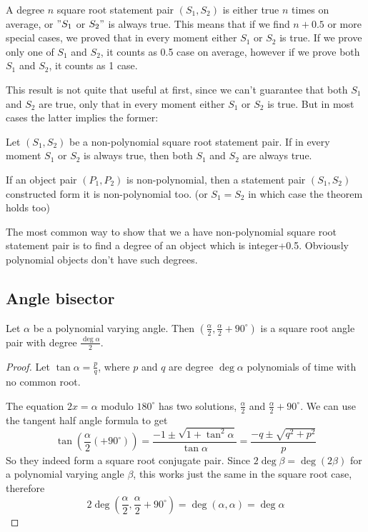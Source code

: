 \documentclass[a4paper]{article}
\begin{document}
A degree $n$ square root statement pair $(S_1,S_2)$ is either true $n$ times on average, or $"S_1$ or $S_2"$ is always true. This means that if we find $n+0.5$ or more special cases, we proved that in every moment either $S_1$ or $S_2$ is true. If we prove only one of $S_1$ and $S_2$, it counts as 0.5 case on average, however if we prove both $S_1$ and $S_2$, it counts as 1 case.

This result is not quite that useful at first, since we can't guarantee that both $S_1$ and $S_2$ are true, only that in every moment either $S_1$ or $S_2$ is true. But in most cases the latter implies the former:

\begin{theorem}
    Let $(S_1,S_2)$ be a non-polynomial square root statement pair. If in every moment $S_1$ or $S_2$ is always true, then both $S_1$ and $S_2$ are always true.
\end{theorem}

If an object pair $(P_1,P_2)$ is non-polynomial, then a statement pair $(S_1,S_2)$ constructed form it is non-polynomial too. (or $S_1=S_2$ in which case the theorem holds too) 

The most common way to show that we a have non-polynomial square root statement pair is to find a degree of an object which is integer+0.5. Obviously polynomial objects don't have such degrees.

\subsection{Angle bisector}
\begin{theorem}
    Let $\alpha$ be a polynomial varying angle. Then $\left(\frac{\alpha}{2},\frac{\alpha}{2}+90^{\circ}\right)$ is a square root angle pair with degree $\frac{\deg\alpha}{2}$.
\end{theorem}
\begin{proof}
    Let $\tan\alpha=\frac{p}{q}$, where $p$ and $q$ are degree $\deg\alpha$ polynomials of time with no common root.

    The equation $2x=\alpha$ modulo $180^{\circ}$ has two solutions, $\frac{\alpha}{2}$ and $\frac{\alpha}{2}+90^{\circ}$. We can use the tangent half angle formula to get
    $$\tan \left(\frac{\alpha}{2}(+90^{\circ})\right)=\frac{-1\pm\sqrt{1+\tan^2\alpha}}{\tan\alpha}=\frac{-q\pm\sqrt{q^2+p^2}}{p}$$
    So they indeed form a square root conjugate pair.
    Since $2\deg \beta=\deg (2\beta)$ for a polynomial varying angle $\beta$, this works just the same in the square root case, therefore
    $$2\deg\left(\frac{\alpha}{2},\frac{\alpha}{2}+90^{\circ}\right)=\deg (\alpha, \alpha)=\deg \alpha$$
\end{proof}
\end{document}

